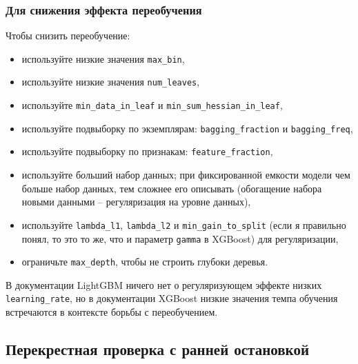 \documentclass[%
	11pt,
	a4paper,
	utf8,
		]{article}
\begin{document}
\subsubsection{Для снижения эффекта переобучения}

Чтобы снизить переобучение:
\begin{itemize}
	\item используйте низкие значения \verb|max_bin|,
	
	\item используйте низкие значения \verb|num_leaves|,
	
	\item используйте \verb|min_data_in_leaf| и \verb|min_sum_hessian_in_leaf|,
	
	\item используйте подвыборку по экземплярам: \verb|bagging_fraction| и \verb|bagging_freq|,
	
	\item используйте подвыборку по признакам: \verb|feature_fraction|,
	
	\item используйте б\emph{о}льший набор данных; при фиксированной емкости модели чем больше набор данных, тем сложнее его описывать (обогащение набора новыми данными -- регуляризация на уровне данных),
	
	\item используйте \verb|lambda_l1|, \verb|lambda_l2| и \verb|min_gain_to_split| (если я правильно понял, то это то же, что и параметр \verb|gamma| в XGBoost) для регуляризации,
	
	\item ограничьте \verb|max_depth|, чтобы не строить глубоки деревья.
\end{itemize}

В документации LightGBM ничего нет о регуляризующем эффекте низких \verb|learning_rate|, но в документации XGBoost низкие значения темпа обучения встречаются в контексте борьбы с переобучением.


\subsection{Перекрестная проверка с ранней остановкой}
\end{document}
